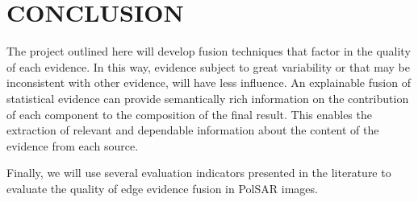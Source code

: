 \documentclass{article}
\begin{document}
\section{CONCLUSION}
The project outlined here will develop fusion techniques that factor in the quality of each evidence. In this way, evidence subject to great variability or that may be inconsistent with other evidence, will have less influence.
An explainable fusion of statistical evidence can provide semantically rich information on the contribution of each component to the composition of the final result. This enables the extraction of relevant and dependable information about the content of the evidence from each source. 

Finally, we will use several evaluation indicators presented in the literature to evaluate the quality of edge evidence fusion in PolSAR images.














\end{document}
